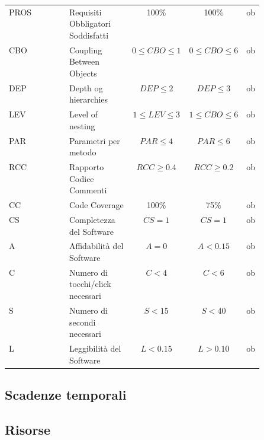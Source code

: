 \begin{table}[H]
\begin{center}
\begin{tabular}{p{0.25\linewidth} p{0.25\linewidth}c!{\color[HTML]{9b240a}\vrule width 0.05cm}cc}
            PROS & Requisiti Obbligatori Soddisfatti & 100\% & 100\% & ob \\

            CBO & Coupling Between Objects & $0\leq CBO \leq 1$ & $0\leq CBO \leq 6$ & ob \\

            DEP & Depth og hierarchies & $DEP \leq 2$ & $DEP \leq 3$ & ob \\

            LEV & Level of nesting & $1\leq LEV \leq 3$ & $1\leq CBO \leq 6$ & ob \\

            PAR & Parametri per metodo & $PAR \leq 4$ & $PAR \leq 6$ & ob \\

            RCC & Rapporto Codice Commenti & $RCC \geq 0.4$ & $RCC \geq 0.2$  & ob \\

            CC & Code Coverage & 100\% & 75\% & ob \\

            CS & Completezza del Software & $CS=1$ & $CS=1$ & ob \\

            A & Affidabilità del Software & $A=0$ & $A < 0.15$ & ob \\

           C & Numero di tocchi/click necessari & $C<4$ & $C<6$& ob \\

           S & Numero di secondi necessari & $S<15$ & $S<40$ & ob \\

           L & Leggibilità del Software & $L<0.15$ & $L>0.10$ & ob \\
		\end{tabular}

	\end{center}
\end{table}

\subsection{Scadenze temporali}

\subsection{Risorse}
